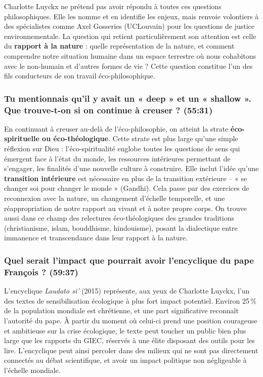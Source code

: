 Charlotte Luyckx ne prétend pas avoir répondu à toutes ces questions philosophiques. Elle les nomme et en identifie les enjeux, mais renvoie volontiers à des spécialistes comme Axel Gosseries (UCLouvain) pour les questions de justice environnementale. La question qui retient particulièrement son attention est celle du \textbf{rapport à la nature} : quelle représentation de la nature, et comment comprendre notre situation humaine dans un espace terrestre où nous cohabitons avec le non-humain et d'autres formes de vie ? Cette question constitue l'un des fils conducteurs de son travail éco-philosophique.

\subsubsection{Tu mentionnais qu'il y avait un « deep » et un « shallow ». Que trouve-t-on si on continue à creuser ? \textnormal{\small(55:31)}}

En continuant à creuser au-delà de l'éco-philosophie, on atteint la strate \textbf{éco-spirituelle ou éco-théologique}. Cette strate est plus large qu'une simple réflexion sur Dieu : l'éco-spiritualité englobe toutes les questions de sens qui émergent face à l'état du monde, les ressources intérieures permettant de s'engager, les finalités d'une nouvelle culture à construire. Elle inclut l'idée qu'une \textbf{transition intérieure} est nécessaire en plus de la transition extérieure -- « se changer soi pour changer le monde » (Gandhi). Cela passe par des exercices de reconnexion avec la nature, un changement d'échelle temporelle, et une réappropriation de notre rapport au vivant et à notre propre corps. On trouve aussi dans ce champ des relectures éco-théologiques des grandes traditions (christianisme, islam, bouddhisme, hindouisme), posant la dialectique entre immanence et transcendance dans leur rapport à la nature.

\subsubsection{Quel serait l'impact que pourrait avoir l'encyclique du pape François ? \textnormal{\small(59:37)}}

L'encyclique \textit{Laudato si'} (2015) représente, aux yeux de Charlotte Luyckx, l'un des textes de sensibilisation écologique à plus fort impact potentiel. Environ 25\,\% de la population mondiale est chrétienne, et une part significative reconnaît l'autorité du pape. À partir du moment où celui-ci prend une position courageuse et ambitieuse sur la crise écologique, le texte peut toucher un public bien plus large que les rapports du GIEC, réservés à une élite disposant des outils pour les lire. L'encyclique peut ainsi percoler dans des milieux qui ne sont pas directement connectés au débat scientifique, et avoir un impact politique non négligeable à l'échelle mondiale.

